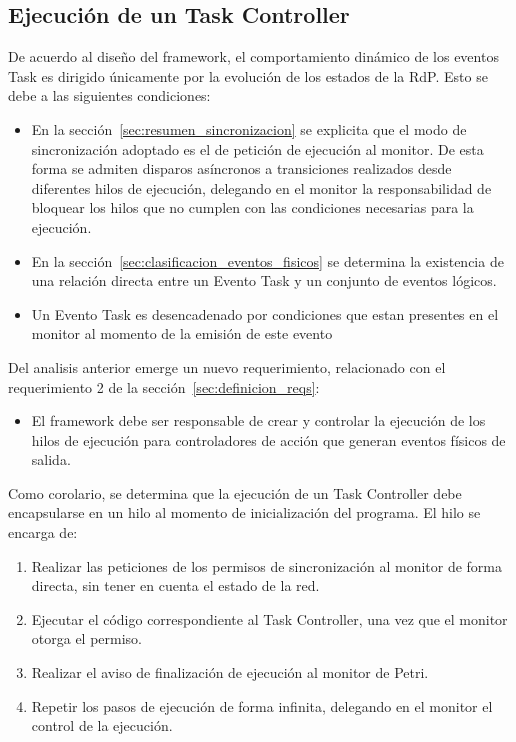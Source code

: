 \subsection{Ejecución de un Task Controller}
\label{sec:ejecucion_task_controller}
De acuerdo al diseño del framework, el comportamiento dinámico de los eventos
Task es dirigido únicamente por la evolución de los estados de la RdP. Esto se
debe a las siguientes condiciones:
\begin{itemize}
    \item En la sección~\ref{sec:resumen_sincronizacion} se explicita que el
    modo de sincronización adoptado es el de petición de ejecución al monitor. De
    esta forma se admiten disparos asíncronos a transiciones realizados desde
    diferentes hilos de ejecución, delegando en el monitor la responsabilidad de
    bloquear los hilos que no cumplen con las condiciones necesarias para la ejecución.

    \item En la sección~\ref{sec:clasificacion_eventos_fisicos} se determina la
    existencia de una relación directa entre un Evento Task y un conjunto de
    eventos lógicos.

    \item Un Evento Task es desencadenado por condiciones que estan presentes en el
    monitor al momento de la emisión de este evento
\end{itemize}

Del analisis anterior emerge un nuevo requerimiento, relacionado
con el requerimiento 2 de la sección~\ref{sec:definicion_reqs}:
\begin{itemize}
    \item El framework debe ser responsable de crear y controlar la
    ejecución de los hilos de ejecución para controladores de acción que
    generan eventos físicos de salida.
\end{itemize}

 Como corolario, se determina que la ejecución de un Task Controller debe
 encapsularse en un hilo al momento de inicialización del programa. El hilo se
 encarga de:
\begin{enumerate}
  \item Realizar las peticiones de los permisos de sincronización al
  monitor de forma directa, sin tener en cuenta el estado de la red.
  \item  Ejecutar el código correspondiente al Task Controller, una vez que el
  monitor otorga el permiso.
  \item  Realizar el aviso de finalización de ejecución al monitor de Petri.
  \item Repetir los pasos de ejecución de forma infinita, delegando en el
  monitor el control de la ejecución.
\end{enumerate}

